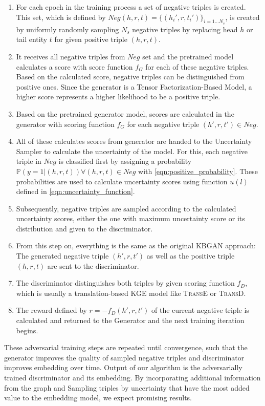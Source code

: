 \begin{enumerate}
    \item For each epoch in the training process a set of negative triples is created.
    This set, which is defined by $Neg(h,r,t)=\{(h_i',r,t_i')\}_{i=1\dots N_s}$, is created by uniformly randomly sampling $N_s$ negative triples by replacing head $h$ or tail entity $t$ for given positive triple $(h, r, t)$.
    
    \item 
    It receives all negative triples from $Neg$ set and the pretrained model calculates a score with score function $f_G$ for each of these negative triples.
    Based on the calculated score, negative triples can be distinguished from positive ones. Since the generator is a Tensor Factorization-Based Model, a higher score represents a higher likelihood to be a positive triple.
    
    \item 
    Based on the pretrained generator model, scores are calculated in the generator with scoring function $f_G$ for each negative triple $(h',r,t') \in Neg$.
    
    \item 
    All of these calculates scores from generator are handed to the Uncertainty Sampler to calculate the uncertainty of the model.
    For this, each negative triple in $Neg$ is classified first by assigning a probability $\mathds{P}(y = 1 | (h,r,t)) \forall (h,r,t) \in Neg$ with \autoref{eqn:positive_probability}.
    These probabilities are used to calculate uncertainty scores using function $u(l)$ defined in \autoref{eqn:uncertainty_function}.

    \item Subsequently, negative triples are sampled according to the calculated uncertainty scores, either the one with maximum uncertainty score or its distribution 
    and given to the discriminator.
    
    \item 
    From this step on, everything is the same as the original \ac{KBGAN} approach:
    The generated negative triple $(h',r,t')$ as well as the positive triple $(h, r, t)$ are sent to the discriminator.
    
    \item 
    The discriminator distinguishes both triples by given scoring function $f_D$, which is usually a translation-based \ac{KGE} model like \textsc{TransE} or \textsc{TransD}.
    
    \item 
    The reward defined by $r = - f_D(h',r,t')$ of the current negative triple is calculated and returned to the Generator and the next training iteration begins.
\end{enumerate}
These adversarial training steps are repeated until convergence, such that the generator improves the quality of sampled negative triples and discriminator improves embedding over time.
Output of our algorithm is the adversarially trained discriminator and its embedding.
By incorporating additional information from the graph and Sampling triples by uncertainty that have the most added value to the embedding model, we expect promising results.